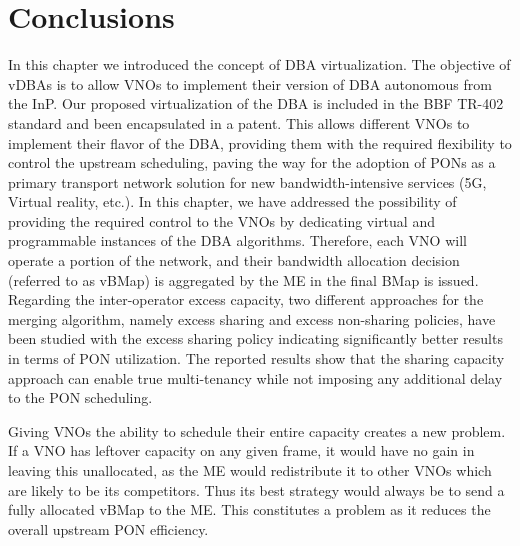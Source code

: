 \section{Conclusions}


In this chapter we introduced the concept of \ac{DBA} virtualization. The objective of \acp{vDBA} is to allow \acp{VNO} to implement their version of \ac{DBA} autonomous from the \ac{InP}.%
Our proposed virtualization of the \ac{DBA} is included in the \ac{BBF} TR-402 standard and been encapsulated in a patent\cite{Nima-vDBA-patent}. This allows different \acp{VNO} to implement their flavor of the \ac{DBA}, providing them with the required flexibility to control the upstream scheduling, paving the way for the adoption of \acp{PON} as a primary transport network solution for new bandwidth-intensive services (\ac{5G}, Virtual reality, etc.). In this chapter, we have addressed the possibility of providing the required control to the \acp{VNO} by dedicating virtual and programmable instances of the \ac{DBA} algorithms. Therefore, each \ac{VNO} will operate a portion of the network, and their bandwidth allocation decision (referred to as \ac{vBMap}) is aggregated by the \ac{ME} in the final \ac{BMap} is issued. Regarding the inter-operator excess capacity, two different approaches for the merging algorithm, namely excess sharing and excess non-sharing policies, have been studied with the excess sharing policy indicating significantly better results in terms of \ac{PON} utilization. The reported results show that the sharing capacity approach can enable true multi-tenancy while not imposing any additional delay to the \ac{PON} scheduling. 

Giving \acp{VNO} the ability to schedule their entire capacity creates a new problem. If a \ac{VNO} has leftover capacity on any given frame, it would have no gain in leaving this unallocated, as the \ac{ME} would redistribute it to other \acp{VNO} which are likely to be its competitors. Thus its best strategy would always be to send a fully allocated \ac{vBMap} to the \ac{ME}. This constitutes a problem as it reduces the overall upstream \ac{PON} efficiency.


